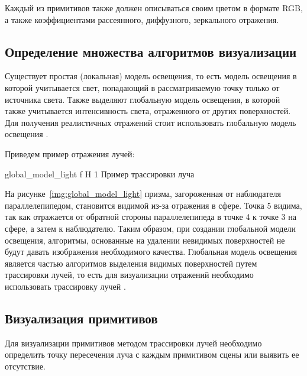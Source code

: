 Каждый из примитивов также должен описываться своим цветом в формате RGB, а также
коэффициентами рассеянного, диффузного, зеркального отражения.



\subsection{Определение множества алгоритмов визуализации}
Существует простая (локальная) модель освещения, то есть модель освещения в которой учитывается свет, попадающий в рассматриваемую точку только от источника света. Также выделяют глобальную модель освещения,  в которой также учитывается интенсивность света, отраженного от других поверхностей.
Для получения реалистичных отражений стоит использовать глобальную модель освещения \cite{Rodgers}. 

Приведем пример отражения лучей:

{global_model_light} %
{f} %
{H} %
{1\textwidth} %
{Пример трассировки луча} %



На рисунке~\ref{img:global_model_light}  призма, загороженная от наблюдателя параллелепипедом, становится видимой из-за отражения в сфере.
Точка 5 видима, так как отражается от обратной стороны параллелепипеда в точке 4 к точке 3 на сфере, а затем к наблюдателю.
Таким образом, при создании глобальной модели освещения, алгоритмы, основанные на удалении невидимых поверхностей не будут давать изображения необходимого качества.
Глобальная модель освещения является частью алгоритмов выделения видимых поверхностей путем трассировки лучей, то есть для визуализации отражений необходимо использовать трассировку лучей \cite{Rodgers}.

\subsection{Визуализация примитивов}
Для визуализации примитивов методом трассировки лучей необходимо определить точку пересечения луча с каждым примитивом сцены или выявить ее отсутствие.


